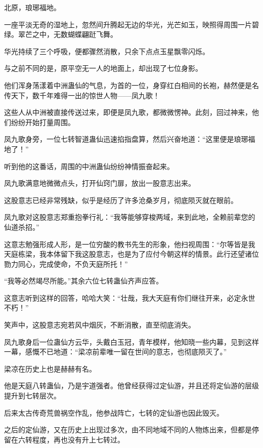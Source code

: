 
\begin{this_body}



北原，琅琊福地。

一座平淡无奇的湿地上，忽然间升腾起无边的华光，光芒如玉，映照得周围一片碧绿。翠芒之中，无数蝴蝶翩跹飞舞。

华光持续了三个呼吸，便都骤然消散，只余下点点玉星飘零闪烁。

与之前不同的是，原平空无一人的地面上，却出现了七位身影。

他们浑身荡漾着中洲蛊仙的气息，为首的一位，身穿红白相间的长袍，赫然便是名传天下，数千年难得一出的惊世人物——凤九歌！

这些人从中洲被直接传送过来，即便是凤九歌，都微微愣神。此刻，回过神来，他们纷纷开始打量周围。

凤九歌身旁，一位七转智道蛊仙迅速掐指盘算，然后兴奋地道：“这里便是琅琊福地了！”

听到他的这番话，周围的中洲蛊仙纷纷神情振奋起来。

凤九歌满意地微微点头，打开仙窍门扉，放出一股意志出来。

这股意志已经非常残缺，似乎是经历了许多沧桑岁月，彻底陨灭就在眼前。

凤九歌对这股意志郑重抱拳行礼：“我等能够穿梭两域，来到此地，全赖前辈您的仙道杀招。”

这意志勉强形成人形，是一位穷酸的教书先生的形象，他扫视周围：“尔等皆是我天庭栋梁，我本体留下我这股意志，也是为了应付今朝这样的情景。此行还望诸位勠力同心，完成使命，不负天庭所托！”

“我等必然竭尽所能。”其余六位七转蛊仙齐声应答。

这意志听到这样的回答，哈哈大笑：“壮哉，我大天庭有你们继往开来，必定永世不朽！”

笑声中，这股意志宛若风中烟灰，不断消散，直至彻底消失。

凤九歌身后一位蛊仙方云华，头戴白玉冠，青年模样，他知晓一些内幕，见到这样一幕，感慨不已地道：“梁凉前辈唯一留在世间的意志，也彻底陨灭了。”

梁凉在历史上也是赫赫有名。

他是天庭八转蛊仙，乃是宇道强者。他曾经获得过定仙游，并且还将定仙游的层级提升到七转层次。

后来太古传奇荒兽祸空作乱，他参战阵亡，七转的定仙游也因此毁灭。

之后的定仙游，又在历史上出现过多次，由不同地域不同的人物炼出来，但都是停留在六转程度，再也没有升上七转过。


\end{this_body}
